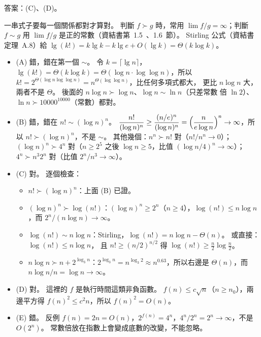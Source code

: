 \begin{pastsoln}
答案：(C)、(D)。

一串式子要每一個關係都對才算對。 判斷 $f \succ g$ 時，常用 $\lim f/g = \infty$；判斷 $f \sim g$
用 $\lim f/g$ 是正的常數（資結書第~1.5~、1.6~節）。 Stirling 公式（資結書定理~A.8）給
$\lg(k!) = k \lg k - k \lg e + O(\lg k) = \Theta(k \log k)$。
\begin{itemize}
\item (A) 錯，錯在第一個 $\sim$。 令 $k = \lceil \lg n \rceil$，$\lg(k!) = \Theta(k \log k) = \Theta(\log n
\cdot \log\log n)$，所以 $k! = 2^{\Theta(\log n \log\log n)} = n^{\Theta(\log\log n)}$，比任何多項式都大，
更比 $n \log n$ 大，兩者不是 $\Theta$。 後面的 $n \log n \succ \log n$、$\log n \sim \ln n$（只差常數
倍 $\ln 2$）、$\ln n \succ 10000^{10000}$（常數）都對。
\item (B) 錯，錯在 $n! \sim (\log n)^n$。 $\dfrac{n!}{(\log n)^n} \ge \dfrac{(n/e)^n}{(\log n)^n} =
\Bigl(\dfrac{n}{e \log n}\Bigr)^n \to \infty$，所以 $n! \succ (\log n)^n$，不是 $\sim$。 其他幾個：$n^n
\succ n!$ 對（$n!/n^n \to 0$）；$(\log n)^n \succ 4^n$ 對（$n \ge 2^{5}$ 之後 $\log n \ge 5$，比值
$(\log n / 4)^n \to \infty$）；$4^n \succ n^3 2^n$ 對（比值 $2^n / n^3 \to \infty$）。
\item (C) 對。 逐個檢查：
  \begin{itemize}
  \item $n! \succ (\log n)^n$：上面 (B) 已證。
  \item $(\log n)^n \succ \log(n!)$：$(\log n)^n \ge 2^n$（$n \ge 4$），$\log(n!) \le n \log n$，而
  $2^n / (n \log n) \to \infty$。
  \item $\log(n!) \sim n \log n$：Stirling，$\log(n!) = n\log n - \Theta(n)$。 或直接：$\log(n!) \le n \log n$，
  且 $n! \ge (n/2)^{n/2}$ 得 $\log(n!) \ge \frac{n}{2}\log\frac{n}{2}$。
  \item $n \log n \succ n + 2^{\log_3 n}$：$2^{\log_3 n} = n^{\log_3 2} \approx n^{0.63}$，所以右邊是
  $\Theta(n)$，而 $n \log n / n = \log n \to \infty$。
  \end{itemize}
\item (D) 對。 這裡的 $f$ 是執行時間這類非負函數。 $f(n) \le c\sqrt{n}$（$n \ge n_0$），兩邊平方得
$f(n)^2 \le c^2 n$，所以 $f(n)^2 = O(n)$。
\item (E) 錯。 反例 $f(n) = 2n = O(n)$，$2^{f(n)} = 4^n$，$4^n / 2^n = 2^n \to \infty$，不是 $O(2^n)$。
常數倍放在指數上會變成底數的改變，不能忽略。
\end{itemize}
\end{pastsoln}
